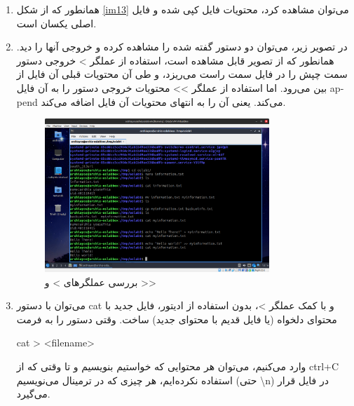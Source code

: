 \documentclass[12pt]{article}
\begin{document}
\begin{enumerate}
        \item 
        همانطور که از شکل
        \ref{im13}
        می‌توان مشاهده کرد، محتویات فایل کپی شده و فایل اصلی یکسان است.

        \item 
        در تصویر زیر، می‌توان دو دستور گفته شده را مشاهده کرده و خروجی آنها را دید. همانطور که از تصویر قابل مشاهده است، استفاده از عملگر
        \textenglish{>}
        خروجی دستور سمت چپش را در فایل سمت راست می‌ریزد، و طی آن محتویات قبلی آن فایل از بین می‌رود. اما استفاده از عملگر
        \textenglish{>>}
        محتویات خروجی دستور را به آن فایل
        \textenglish{append}
        می‌کند. یعنی آن را به انتهای محتویات آن فایل اضافه می‌کند.

        \begin{figure}[H]
		\centering
		\includegraphics[width=0.8\textwidth]{report1-resources/14.png}
		\caption{بررسی عملگرهای \textenglish{>} و \textenglish{>>}}
	\end{figure}

        \item 
        می‌توان با دستور 
        cat
        و با کمک عملگر 
        \textenglish{>}،
        بدون استفاده از ادیتور، فایل جدید با محتوای دلخواه (یا فایل قدیم با محتوای جدید) ساخت.
        وقتی دستور را به فرمت

        \begin{english}
            cat > <filename>
        \end{english}

        وارد می‌کنیم، می‌توان هر محتوایی که خواستیم بنویسیم و تا وقتی که  از
        \textenglish{ctrl+C}
        استفاده نکرده‌ایم، هر چیزی که در ترمینال می‌نویسیم (حتی 
        \textenglish{\textbackslash{}n})
        در فایل قرار می‌گیرد.


\end{enumerate}
\end{document}
